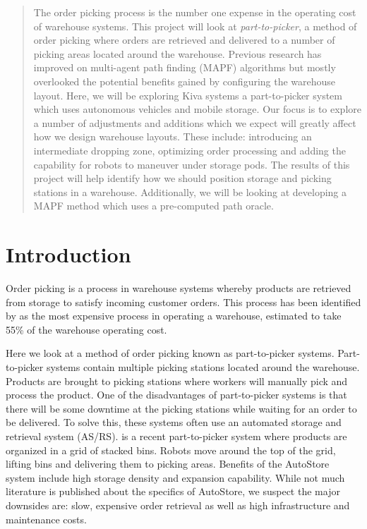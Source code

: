 \documentclass[a4paper,11pt]{article}
\begin{document}
	\begin{abstract} %
	
	\noindent The order picking process is the number one expense in the operating cost of warehouse systems. This project will look at \textit{part-to-picker}, a method of order picking where orders are retrieved and delivered to a number of picking areas located around the warehouse. Previous research has improved on multi-agent path finding (MAPF) algorithms but mostly overlooked the potential benefits gained by configuring the warehouse layout.
	Here, we will be exploring Kiva systems a part-to-picker system which uses autonomous vehicles and mobile storage. Our focus is to explore a number of adjustments and additions which we expect will greatly affect how we design warehouse layouts.
	These include: introducing an intermediate dropping zone, optimizing order processing and adding the capability for robots to maneuver under storage pods.
	The results of this project will help identify how we should position storage and picking stations in a warehouse. Additionally, we will be looking at developing a MAPF method which uses a pre-computed path oracle.
	
\end{abstract}
\section{Introduction}
Order picking is a process in warehouse systems whereby products are retrieved from storage to satisfy incoming customer orders. This process has been identified by \cite{de2007design} as the most expensive process in operating a warehouse, estimated to take 55\% of the warehouse operating cost.

Here we look at a method of order picking known as part-to-picker systems. Part-to-picker systems contain multiple picking stations located around the warehouse. Products are brought to picking stations where workers will manually pick and process the product. One of the disadvantages of part-to-picker systems is that there will be some downtime at the picking stations while waiting for an order to be delivered. To solve this, these systems often use an automated storage and retrieval system (AS/RS). \cite{introduction2015autostore} is a recent part-to-picker system where products are organized in a grid of stacked bins. Robots move around the top of the grid, lifting bins and delivering them to picking areas. Benefits of the AutoStore system include high storage density and expansion capability. While not much literature is published about the specifics of AutoStore, we suspect the major downsides are: slow, expensive order retrieval as well as high infrastructure and maintenance costs.
\end{document}
